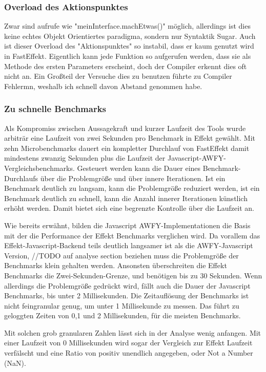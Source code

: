 \subsubsection{ Overload des Aktionspunktes }
Zwar sind aufrufe wie "meinInterface.machEtwas()" möglich, allerdings ist dies keine echtes Objekt Orientiertes paradigma, sondern nur Syntaktik Sugar.
Auch ist dieser Overload des "Aktionspunktes" so instabil, dass er kaum genutzt wird in FastEffekt. Eigentlich kann jede Funktion so aufgerufen werden, dass sie als Methode des ersten Parameters erscheint, 
doch der Compiler erkennt dies oft nicht an. Ein Großteil der Versuche dies zu benutzen führte zu Compiler Fehlermn, weshalb ich schnell davon Abstand genommen habe.

\subsubsection{ Zu schnelle Benchmarks }
Als Kompromiss zwischen Aussagekraft und kurzer Laufzeit des Tools wurde arbiträr eine Laufzeit von zwei Sekunden pro Benchmark in Effekt gewählt.
Mit zehn Microbenchmarks dauert ein kompletter Durchlauf von FastEffekt damit mindestens zwanzig Sekunden plus die Laufzeit der Javascript-AWFY-Vergleichsbenchmarks.
Gesteuert werden kann die Dauer eines Benchmark-Durchlaufs über die Problemgröße und über innere Iterationen. Ist ein Benchmark deutlich zu langsam, kann die Problemgröße reduziert werden, ist ein Benchmark deutlich zu schnell, kann die Anzahl innerer Iterationen künstlich erhöht werden. Damit bietet sich eine begrenzte Kontrolle über die Laufzeit an.

Wie bereits erwähnt, bilden die Javascript AWFY-Implementationen die Basis mit der die Performance der Effekt Benchmarks verglichen wird.
Da vorallem das Effekt-Javascript-Backend teils deutlich langsamer ist als die AWFY-Javascript Version, //TODO auf analyse section beziehen
 muss die Problemgröße der Benchmarks klein gehalten werden. Ansonsten überschreiten die Effekt Benchmarks die Zwei-Sekunden-Grenze, und benötigen bis zu 30 Sekunden. Wenn allerdings die Problemgröße gedrückt wird, fällt auch die Dauer der Javascript Benchmarks, bis unter 2 Millisekunden. Die Zeitauflösung der Benchmarks ist nicht feingranular genug, um unter 1 Millisekunde zu messen. Das führt zu geloggten Zeiten von 0,1 und 2 Millisekunden, für die meisten Benchmarks. 

Mit solchen grob granularen Zahlen lässt sich in der Analyse wenig anfangen. Mit einer Laufzeit von 0 Millisekunden wird sogar der Vergleich zur Effekt Laufzeit verfälscht und eine Ratio von positiv unendlich angegeben, oder Not a Number (NaN).

